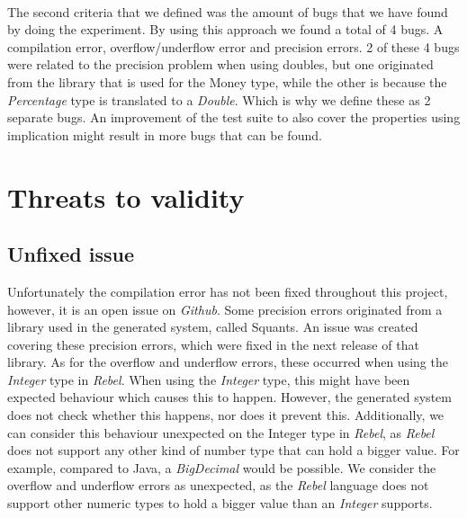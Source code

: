 \\
The second criteria that we defined was the amount of bugs that we have found by doing the experiment. By using this approach we found a total of 4 bugs. A compilation error, overflow/underflow error and precision errors. 2 of these 4 bugs were related to the precision problem when using doubles, but one originated from the library that is used for the Money type, while the other is because the \textit{Percentage} type is translated to a \textit{Double}. Which is why we define these as 2 separate bugs. An improvement of the test suite to also cover the properties using implication might result in more bugs that can be found.



\section{Threats to validity}

\subsection{Unfixed issue}
Unfortunately the compilation error has not been fixed throughout this project, however, it is an open issue on \textit{Github}. Some precision errors originated from a library used in the generated system, called Squants. An issue was created covering these precision errors, which were fixed in the next release of that library. As for the overflow and underflow errors, these occurred when using the \textit{Integer} type in \textit{Rebel}. When using the \textit{Integer} type, this might have been expected behaviour which causes this to happen. However, the generated system does not check whether this happens, nor does it prevent this. Additionally, we can consider this behaviour unexpected on the Integer type in
\textit{Rebel}, as \textit{Rebel} does not support any other kind of number type that can hold a bigger value. For example, compared to
Java, a \textit{BigDecimal} would be possible. We consider the overflow and underflow errors as unexpected, as the \textit{Rebel} language does not support other numeric types to hold a bigger value than an \textit{Integer} supports.
